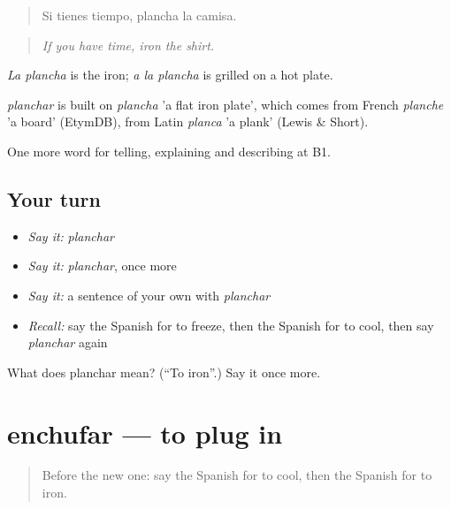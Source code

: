 \begin{quote}
Si tienes tiempo, plancha la camisa.
\end{quote}

\begin{quote}
\emph{If you have time, iron the shirt.}
\end{quote}

\emph{La plancha} is the iron; \emph{a la plancha} is grilled on a hot plate.

\begin{cousinweb}
\emph{planchar} is built on \emph{plancha} 'a flat iron plate', which comes from French \emph{planche} 'a board' (EtymDB), from Latin \emph{planca} 'a plank' (Lewis \& Short).
\end{cousinweb}

\begin{grammarlens}[title={What you've built}]
One more word for telling, explaining and describing at B1.
\end{grammarlens}

\subsection*{Your turn}
\begin{itemize}
\raggedright
  \item \emph{Say it:} \emph{planchar}
  \item \emph{Say it:} \emph{planchar}, once more
  \item \emph{Say it:} a sentence of your own with \emph{planchar}
  \item \emph{Recall:} say the Spanish for to freeze, then the Spanish for to cool, then say \emph{planchar} again
\end{itemize}

\begin{tcolorbox}[breakable,colback=teal!4,colframe=teal!35!black,title={Before you move on}]
What does planchar mean? (\textquotedblleft{}To iron\textquotedblright{}.) Say it once more.
\end{tcolorbox}
\section[enchufar]{enchufar — to plug in}

\label{lesson:ES-C777-enchufar}



\begin{quote}
Before the new one: say the Spanish for to cool, then the Spanish for to iron.
\end{quote}


